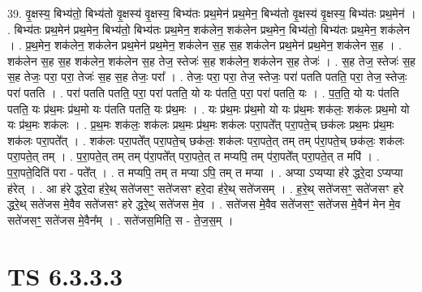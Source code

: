 \documentclass[17pt]{extarticle}
\begin{document}
39. वृ॒क्षस्य॒ बिभ्य॑तो॒ बिभ्य॑तो वृ॒क्षस्य॑ वृ॒क्षस्य॒ बिभ्य॑तः प्रथ॒मेन॑ प्रथ॒मेन॒ बिभ्य॑तो वृ॒क्षस्य॑ वृ॒क्षस्य॒ बिभ्य॑तः प्रथ॒मेन॑ । . बिभ्य॑तः प्रथ॒मेन॑ प्रथ॒मेन॒ बिभ्य॑तो॒ बिभ्य॑तः प्रथ॒मेन॒ शक॑लेन॒ शक॑लेन प्रथ॒मेन॒ बिभ्य॑तो॒ बिभ्य॑तः प्रथ॒मेन॒ शक॑लेन । . प्र॒थ॒मेन॒ शक॑लेन॒ शक॑लेन प्रथ॒मेन॑ प्रथ॒मेन॒ शक॑लेन स॒ह स॒ह शक॑लेन प्रथ॒मेन॑ प्रथ॒मेन॒ शक॑लेन स॒ह । . शक॑लेन स॒ह स॒ह शक॑लेन॒ शक॑लेन स॒ह तेज॒ स्तेजः॑ स॒ह शक॑लेन॒ शक॑लेन स॒ह तेजः॑ । . स॒ह तेज॒ स्तेजः॑ स॒ह स॒ह तेजः॒ परा॒ परा॒ तेजः॑ स॒ह स॒ह तेजः॒ परा᳚ । . तेजः॒ परा॒ परा॒ तेज॒ स्तेजः॒ परा॑ पतति पतति॒ परा॒ तेज॒ स्तेजः॒ परा॑ पतति । . परा॑ पतति पतति॒ परा॒ परा॑ पतति॒ यो यः प॑तति॒ परा॒ परा॑ पतति॒ यः । . प॒त॒ति॒ यो यः प॑तति पतति॒ यः प्र॑थ॒मः प्र॑थ॒मो यः प॑तति पतति॒ यः प्र॑थ॒मः । . यः प्र॑थ॒मः प्र॑थ॒मो यो यः प्र॑थ॒मः शक॑लः॒ शक॑लः प्रथ॒मो यो यः प्र॑थ॒मः शक॑लः । . प्र॒थ॒मः शक॑लः॒ शक॑लः प्रथ॒मः प्र॑थ॒मः शक॑लः परा॒पते᳚त् परा॒पते॒च् छक॑लः प्रथ॒मः प्र॑थ॒मः शक॑लः परा॒पते᳚त् । . शक॑लः परा॒पते᳚त् परा॒पते॒च् छक॑लः॒ शक॑लः परा॒पते॒त् तम् तम् प॑रा॒पते॒च् छक॑लः॒ शक॑लः परा॒पते॒त् तम् । . प॒रा॒पते॒त् तम् तम् प॑रा॒पते᳚त् परा॒पते॒त् त मप्यपि॒ तम् प॑रा॒पते᳚त् परा॒पते॒त् त मपि॑ । . प॒रा॒पते॒दिति॑ परा - पते᳚त् । . त मप्यपि॒ तम् त मप्या ऽपि॒ तम् त मप्या । . अप्या ऽप्यप्या ह॑रे द्धरे॒दा ऽप्यप्या ह॑रेत् । . आ ह॑रे द्धरे॒दा ह॑रे॒थ् सते॑जसꣳ॒॒ सते॑जसꣳ हरे॒दा ह॑रे॒थ् सते॑जसम् । . ह॒रे॒थ् सते॑जसꣳ॒॒ सते॑जसꣳ हरे द्धरे॒थ् सते॑जस मे॒वैव सते॑जसꣳ हरे द्धरे॒थ् सते॑जस मे॒व । . सते॑जस मे॒वैव सते॑जसꣳ॒॒ सते॑जस मे॒वैन॑ मेन मे॒व सते॑जसꣳ॒॒ सते॑जस मे॒वैन᳚म् । . सते॑जस॒मिति॒ स - ते॒ज॒स॒म् । \newline
\pagebreak
{}

\section{ TS 6.3.3.3 }
\end{document}
